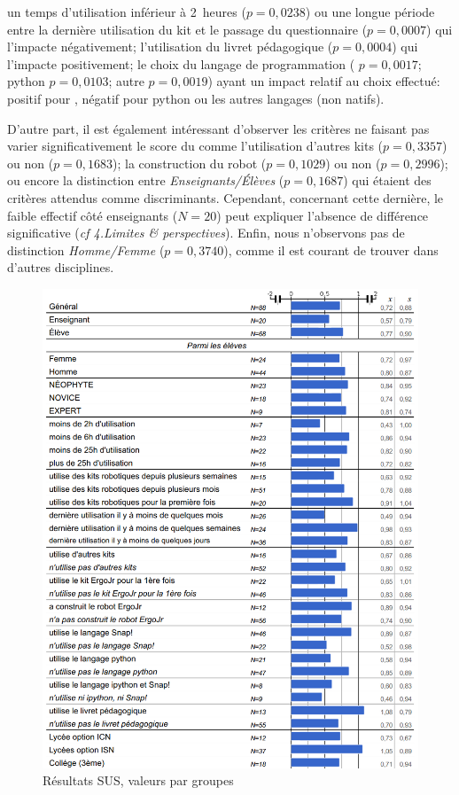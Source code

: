         un temps d'utilisation inférieur à 2~heures ($p=0,0238$) ou une longue période entre la dernière utilisation du kit et le passage du questionnaire ($p=0,0007$) qui l'impacte négativement;
        l'utilisation du livret pédagogique ($p=0,0004$) qui l'impacte positivement;
        le choix du langage de programmation ( $p=0,0017$; python $p=0,0103$; autre $p=0,0019$) ayant un impact relatif au choix effectué:
        positif pour , négatif pour python ou les autres langages (non natifs).\par%
        D'autre part, il est également intéressant d'observer les critères ne faisant pas varier significativement le score du  comme l'utilisation d'autres kits ($p=0,3357$) ou non ($p=0,1683$);
        la construction du robot ($p=0,1029$) ou non ($p=0,2996$);
        ou encore la distinction entre \textit{Enseignants/Élèves} ($p=0,1687$) qui étaient des critères attendus comme discriminants.
        Cependant, concernant cette dernière, le faible effectif côté enseignants ($N=20$) peut expliquer l'absence de différence significative (\textit{cf 4.Limites \& perspectives}).
        Enfin, nous n'observons pas de distinction \textit{Homme/Femme} ($p=0,3740$), comme il est courant de trouver dans d'autres disciplines.
        \begin{figure}[!h]
            \centering
            \includegraphics[width=0.9\linewidth]{Figures/Desprez_didapro-sus_val_moy.png}
            \caption{Résultats SUS, valeurs par groupes}\label{fig:sus_val_moy}
        \end{figure}
